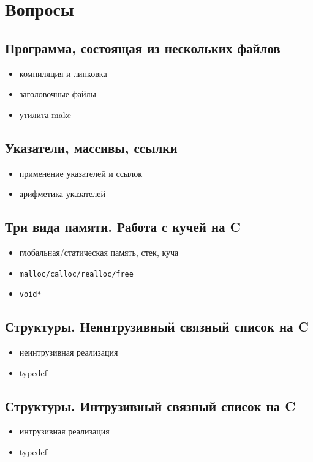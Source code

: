 % 
% 

\chapter{Вопросы}
\section{Программа, состоящая из нескольких файлов}
\begin{itemize}
    \item компиляция и линковка
    \item заголовочные файлы
    \item утилита make
\end{itemize}
\section{Указатели, массивы, ссылки}
\begin{itemize}
    \item применение указателей и ссылок
    \item арифметика указателей
\end{itemize}
\section{Три вида памяти. Работа с кучей на C}
\begin{itemize}
    \item глобальная/статическая память, стек, куча
    \item \begin{verbatim}malloc/calloc/realloc/free\end{verbatim}
    \item \begin{verbatim}void*\end{verbatim}
\end{itemize}
\section{Структуры. Неинтрузивный связный список на C}
\begin{itemize}
    \item неинтрузивная реализация
    \item typedef
\end{itemize}
\section{Структуры. Интрузивный связный список на C}
\begin{itemize}
    \item интрузивная реализация
    \item typedef
\end{itemize}
